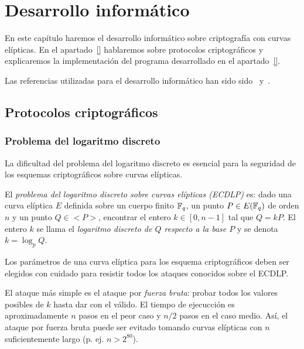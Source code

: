 \chapter{Desarrollo informático}
\label{ch:Desarrollo informático}

En este capítulo haremos el desarrollo informático sobre criptografía con curvas elípticas. En el apartado~\ref{} hablaremos sobre protocolos criptográficos y explicaremos la implementación del programa desarrollado en el apartado~\ref{}.

Las referencias utilizadas para el desarrollo informático han sido sido~\cite{Hankerson:2003} y~\cite{Washington:2008}.


\section{Protocolos criptográficos}
\label{sec:Protocolos criptográficos}


\subsection{Problema del logaritmo discreto}
\label{sub:Problema del logaritmo discreto}

La dificultad del problema del logaritmo discreto es esencial para la seguridad de los esquemas criptográficos sobre curvas elípticas.

\begin{definicion}
    El \emph{problema del logaritmo discreto sobre curvas elípticas (ECDLP)} es: dado una curva elíptica $E$ definida sobre un cuerpo finito $\mathbb{F}_q$, un punto $P \in E(\mathbb{F}_q)$ de orden $n$ y un punto $Q \in <P>$, encontrar el entero $k \in [0, n - 1]$ tal que $Q = k P$. El entero $k$ se llama el \emph{logaritmo discreto de $Q$ respecto a la base $P$} y se denota $k = \log_p Q$.
\end{definicion}

Los parámetros de una curva elíptica para los esquema criptográficos deben ser elegidos con cuidado para resistir todos los ataques conocidos sobre el ECDLP.

El ataque más simple es el ataque por \emph{fuerza bruta}: probar todos los valores posibles de $k$ hasta dar con el válido. El tiempo de ejecucción es aproximadamente $n$ pasos en el peor caso y $n / 2$ pasos en el caso medio. Así, el ataque por fuerza bruta puede ser evitado tomando curvas elípticas con $n$ suficientemente largo (p. ej. $n > 2^{80}$).

